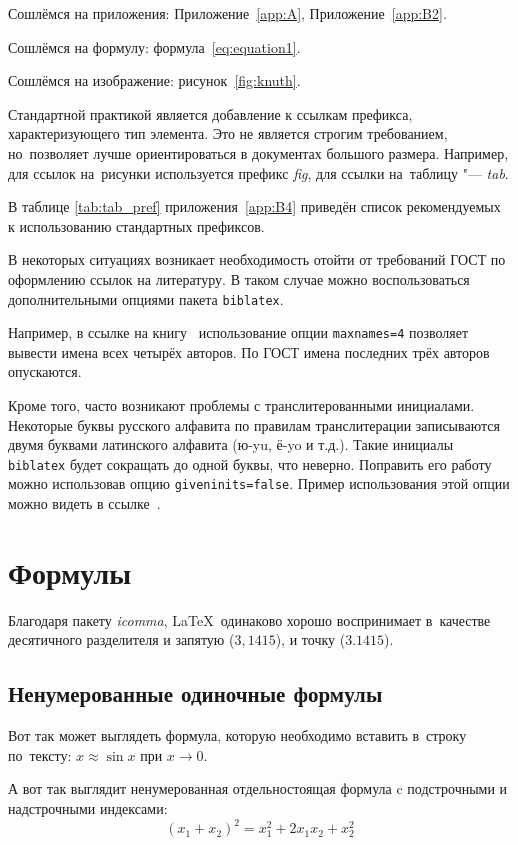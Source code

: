Сошлёмся на приложения: Приложение~\cref{app:A}, Приложение~\cref{app:B2}.

Сошлёмся на формулу: формула~\cref{eq:equation1}.

Сошлёмся на изображение: рисунок~\cref{fig:knuth}.

Стандартной практикой является добавление к ссылкам префикса, характеризующего тип элемента.
Это не является строгим требованием, но~позволяет лучше ориентироваться в документах большого размера.
Например, для ссылок на~рисунки используется префикс \textit{fig},
для ссылки на~таблицу "--- \textit{tab}.

В таблице \cref{tab:tab_pref} приложения~\cref{app:B4} приведён список рекомендуемых
к использованию стандартных префиксов.

В некоторых ситуациях возникает необходимость отойти от требований ГОСТ по оформлению ссылок на
литературу.
В таком случае можно воспользоваться дополнительными опциями пакета \verb+biblatex+.

Например, в ссылке на книгу~\cite{sobenin_kdv} использование опции \verb+maxnames=4+ позволяет
вывести имена всех четырёх авторов.
По ГОСТ имена последних трёх авторов опускаются.

Кроме того, часто возникают проблемы с транслитерованными инициалами. Некоторые буквы русского
алфавита по правилам транслитерации записываются двумя буквами латинского алфавита (ю-yu, ё-yo и
т.д.).
Такие инициалы \verb+biblatex+ будет сокращать до одной буквы, что неверно.
Поправить его работу можно использовав опцию \verb+giveninits=false+.
Пример использования этой опции можно видеть в ссылке~\cite{initials}.

\section{Формулы}\label{sec:ch1/sec3}

Благодаря пакету \textit{icomma}, \LaTeX~одинаково хорошо воспринимает
в~качестве десятичного разделителя и запятую (\(3,1415\)), и точку (\(3.1415\)).

\subsection{Ненумерованные одиночные формулы}\label{subsec:ch1/sec3/sub1}

Вот так может выглядеть формула, которую необходимо вставить в~строку
по~тексту: \(x \approx \sin x\) при \(x \to 0\).

А вот так выглядит ненумерованная отдельностоящая формула c подстрочными
и надстрочными индексами:
\[
    (x_1+x_2)^2 = x_1^2 + 2 x_1 x_2 + x_2^2
\]

